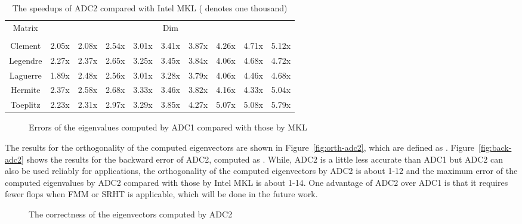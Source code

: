 \documentclass[times]{nlaauth}
\begin{document}
\begin{table}[ptbh]
\caption{The speedups of {ADC2} compared with Intel MKL ( denotes one thousand)}
\label{tab:Ex2-rhss}
\begin{center}\begin{tabular}
[c]{|c|ccccccccc|}\hline
\multirow{2}{*}{Matrix}  & \multicolumn{9}{c|}{Dim} \\ \cline{2-10}
  &  & &  &  &  &  &  & &   \\ \hline \hline
Clement  & 2.05x & 2.08x & 2.54x & 3.01x & 3.41x & 3.87x & 4.26x & 4.71x & 5.12x   \\
Legendre & 2.27x & 2.37x & 2.65x & 3.25x & 3.45x & 3.84x & 4.06x & 4.68x & 4.72x  \\
Laguerre & 1.89x & 2.48x & 2.56x & 3.01x & 3.28x & 3.79x & 4.06x & 4.46x & 4.68x \\
Hermite  & 2.37x & 2.58x & 2.68x & 3.33x & 3.46x & 3.82x & 4.16x & 4.33x & 5.04x  \\
Toeplitz & 2.23x & 2.31x & 2.97x & 3.29x & 3.85x & 4.27x & 5.07x & 5.08x & 5.79x \\ \hline
\end{tabular}
\end{center}
\end{table}




\begin{figure}[ptbh]
\centering
{}
\caption{Errors of the eigenvalues computed by ADC1 compared with those by MKL}\label{fig:Ex1-errors}\end{figure}

The results for the orthogonality of the computed eigenvectors are shown in Figure~\ref{fig:orth-adc2}, which are defined as .
Figure~\ref{fig:back-adc2} shows the results for the backward error of ADC2, computed as .
While, ADC2 is a little less accurate than ADC1 but ADC2 can also be used reliably for applications,
the orthogonality of the computed eigenvectors by ADC2 is about 1-12 and the maximum error
of the computed eigenvalues by ADC2 compared with those by Intel MKL is about 1-14.
One advantage of ADC2 over ADC1 is that it requires fewer flops when FMM or SRHT is applicable,
which will be done in the future work.

\begin{figure}[ptbh]
\centering
{}
\caption{The correctness of the eigenvectors computed by ADC2}\label{fig:orth-check}
\end{figure}
\end{document}
